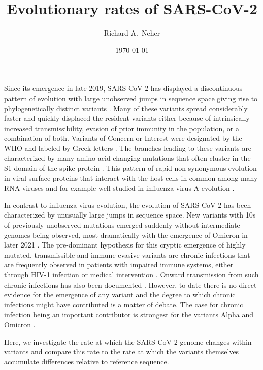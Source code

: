 \documentclass[aps,rmp, twocolumn]{revtex4}
\begin{document}
\title{Evolutionary rates of SARS-CoV-2}
\author{Richard A.~Neher}
\date{\today}
\maketitle

Since its emergence in late 2019, SARS-CoV-2 has displayed a discontinuous pattern of evolution with large unobserved jumps in sequence space giving rise to phylogenetically distinct variants \citep{hodcroft_spread_2021,volz_assessing_2021,tegally_detection_2021,faria_genomics_2021,naveca_covid-19_2021,viana_rapid_2022}.
Many of these variants spread considerably faster and quickly displaced the resident variants either because of intrinsically increased transmissibility, evasion of prior immunity in the population, or a combination of both.
Variants of Concern or Interest were designated by the WHO and labeled by Greek letters \citep{konings_sars-cov-2_2021}.
The branches leading to these variants are characterized by many amino acid changing mutations that often cluster in the S1 domain of the spike protein \citep{kistler_rapid_2022}.
This pattern of rapid non-synonymous evolution in viral surface proteins that interact with the host cells in common among many RNA viruses and for example well studied in influenza virus A evolution \citep{bhatt_genomic_2011,strelkowa_clonal_2012}.

In contrast to influenza virus evolution, the evolution of SARS-CoV-2 has been characterized by unusually large jumps in sequence space.
New variants with 10s of previously unobserved mutations emerged suddenly without intermediate genomes being observed, most dramatically with the emergence of Omicron in later 2021 \citep{viana_rapid_2022}.
The pre-dominant hypothesis for this cryptic emergence of highly mutated, transmissible and immune evasive variants are chronic infections that are frequently observed in patients with impaired immune systems, either through HIV-1 infection \citep{cele_sars-cov-2_2022} or medical intervention \citep{choi_persistence_2020,kemp_sars-cov-2_2021}.
Onward transmission from such chronic infections has also been documented \citep{gonzalez-reiche_intrahost_2022}.
However, to date there is no direct evidence for the emergence of any variant and the degree to which chronic infections might have contributed is a matter of debate.
The case for chronic infection being an important contributor is strongest for the variants Alpha and Omicron
\citep{hill_origins_2022}.

Here, we investigate the rate at which the SARS-CoV-2 genome changes within variants and compare this rate to the rate at which the variants themselves accumulate differences relative to reference sequence.
\end{document}
